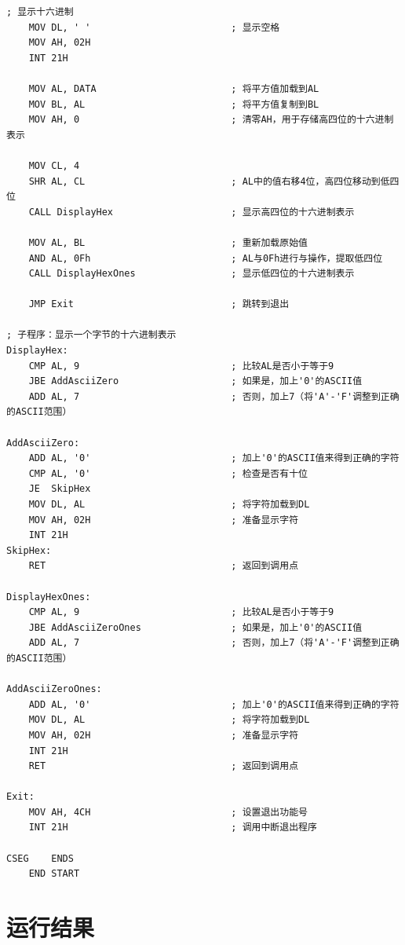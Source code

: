 \documentclass[12pt]{article}
\begin{document}
\begin{lstlisting}[caption={汇编源代码}, label=lst:asm2]
    ; 显示十六进制
    MOV DL, ' '                         ; 显示空格
    MOV AH, 02H
    INT 21H

    MOV AL, DATA                        ; 将平方值加载到AL
    MOV BL, AL                          ; 将平方值复制到BL
    MOV AH, 0                           ; 清零AH，用于存储高四位的十六进制表示

    MOV CL, 4
    SHR AL, CL                          ; AL中的值右移4位，高四位移动到低四位
    CALL DisplayHex                     ; 显示高四位的十六进制表示

    MOV AL, BL                          ; 重新加载原始值
    AND AL, 0Fh                         ; AL与0Fh进行与操作，提取低四位
    CALL DisplayHexOnes                 ; 显示低四位的十六进制表示

    JMP Exit                            ; 跳转到退出

; 子程序：显示一个字节的十六进制表示
DisplayHex:
    CMP AL, 9                           ; 比较AL是否小于等于9
    JBE AddAsciiZero                    ; 如果是，加上'0'的ASCII值
    ADD AL, 7                           ; 否则，加上7（将'A'-'F'调整到正确的ASCII范围）

AddAsciiZero:
    ADD AL, '0'                         ; 加上'0'的ASCII值来得到正确的字符
    CMP AL, '0'                         ; 检查是否有十位
    JE  SkipHex
    MOV DL, AL                          ; 将字符加载到DL
    MOV AH, 02H                         ; 准备显示字符
    INT 21H
SkipHex:
    RET                                 ; 返回到调用点

DisplayHexOnes:
    CMP AL, 9                           ; 比较AL是否小于等于9
    JBE AddAsciiZeroOnes                ; 如果是，加上'0'的ASCII值
    ADD AL, 7                           ; 否则，加上7（将'A'-'F'调整到正确的ASCII范围）

AddAsciiZeroOnes:
    ADD AL, '0'                         ; 加上'0'的ASCII值来得到正确的字符
    MOV DL, AL                          ; 将字符加载到DL
    MOV AH, 02H                         ; 准备显示字符
    INT 21H
    RET                                 ; 返回到调用点

Exit:
    MOV AH, 4CH                         ; 设置退出功能号
    INT 21H                             ; 调用中断退出程序

CSEG    ENDS
    END START

    \end{lstlisting}

\section{运行结果}
\end{document}
